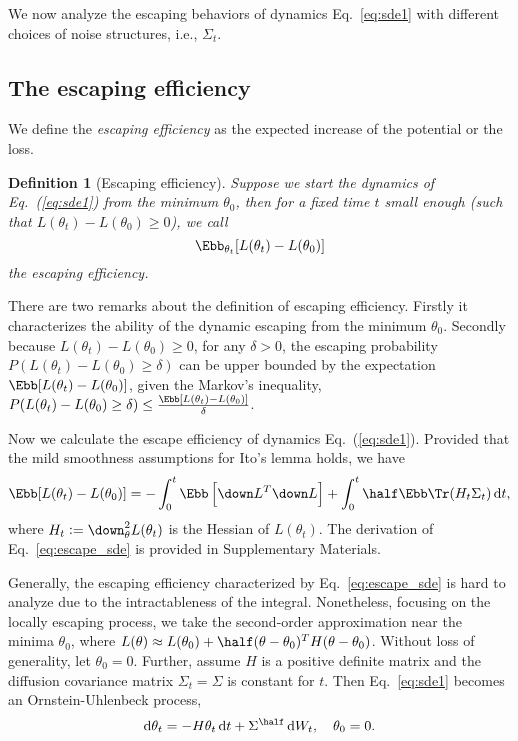 \documentclass{article}
\newtheorem{definition}{Definition}
\begin{document}
We now analyze the escaping behaviors of dynamics Eq.~\eqref{eq:sde1} with different choices of noise structures, i.e., $\Sigma_t$.

\subsection{The escaping efficiency}
We define the \emph{escaping efficiency} as the expected increase of the potential or the loss.
\begin{definition}[Escaping efficiency]
    Suppose we start the dynamics of Eq.~(\ref{eq:sde1}) from the minimum $\theta_0 $, then for a fixed time $t$ small enough (such that $L(\theta_t) - L(\theta_0) \ge 0$), we call 
    \begin{equation}
        \Ebb_{\theta_t}[L(\theta_t) - L(\theta_0)]
    \end{equation}
    the \emph{escaping efficiency}.
\end{definition}
There are two remarks about the definition of escaping efficiency.
Firstly it characterizes the ability of the dynamic escaping from the minimum $\theta_0$.
Secondly because $L(\theta_t) - L(\theta_0) \ge 0$, for any $\delta > 0$, the escaping probability $P(L(\theta_t)-L(\theta_0) \ge \delta)$ can be upper bounded by the expectation $\Ebb[L(\theta_t) - L(\theta_0)]$, given the Markov's inequality, $P(L(\theta_t) - L(\theta_0) \ge \delta) \le \frac{\Ebb [L(\theta_t)-L(\theta_0)]}{\delta}$.

Now we calculate the escape efficiency of dynamics Eq.~(\ref{eq:sde1}).
Provided that the mild smoothness assumptions for Ito's lemma holds, we have
\begin{equation}
    \Ebb [L(\theta_t)-L(\theta_0)] = - \int_{0}^{t} \Ebb \left[ \down L^T \down L\right]+\int_{0}^{t} \half \Ebb \Tr (H_t\Sigma_t) \dif t,
    \label{eq:escape_sde}
\end{equation}
where $H_t := \down^2_\theta L(\theta_t)$ is the Hessian of $L(\theta_t)$.
The derivation of Eq.~\eqref{eq:escape_sde} is provided in Supplementary Materials.

Generally, the escaping efficiency characterized by Eq.~\eqref{eq:escape_sde} is hard to analyze due to the intractableness of the integral.
Nonetheless, focusing on the locally escaping process, we take the second-order approximation near the minima $\theta_0$, where $L(\theta) \approx L(\theta_0) + \half (\theta - \theta_0)^T H (\theta - \theta_0)$.
Without loss of generality, let $\theta_0 = 0$.
Further, assume $H$ is a positive definite matrix and the diffusion covariance matrix $\Sigma_t=\Sigma$ is constant for $t$.
Then Eq.~\eqref{eq:sde1} becomes an Ornstein-Uhlenbeck process,
\begin{equation}
    \dif \theta_t = -H \theta_t \dif t + \Sigma^{\half} \dif W_t, \quad \theta_0 = 0. \label{eq:ou}
\end{equation}
\end{document}
